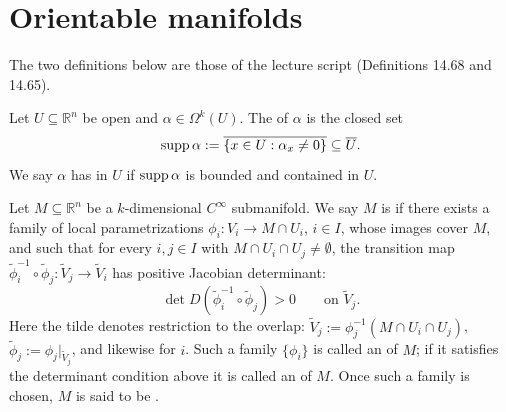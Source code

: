 
\section{Orientable manifolds}
\label{sec:orientable_manifolds}

\begin{ainote}
The two definitions below are those of the lecture script (Definitions 14.68 and 14.65).
\end{ainote}

\begin{definition}
\label{def:support_of_k_form}
Let $U \subseteq \mathbb{R}^n$ be open and $\alpha \in \Omega^k(U)$. The 
of $\alpha$ is the closed set
\[\operatorname{supp}\alpha := \overline{\{x\in U : \alpha_x \neq 0\}} \subseteq \overline{U}.\]
We say $\alpha$ has  in $U$ if $\operatorname{supp}\alpha$ is bounded and contained
in $U$.
\end{definition}

\begin{definition}
\label{def:orientable_manifold}
Let $M \subseteq \mathbb{R}^n$ be a $k$-dimensional $C^\infty$ submanifold. We say $M$ is
  if there exists a family of local
parametrizations $\phi_i : V_i \to M \cap U_i$, $i \in I$, whose images cover $M$, and such
that for every $i,j \in I$ with $M \cap U_i \cap U_j \neq \emptyset$, the transition map
$\widetilde\phi_i^{-1}\circ\widetilde\phi_j : \widetilde V_j \to \widetilde V_i$ has positive
Jacobian determinant:
\[\det D(\widetilde\phi_i^{-1}\circ\widetilde\phi_j) > 0 \qquad \text{on } \widetilde V_j.\]
Here the tilde denotes restriction to the overlap: $\widetilde V_j := \phi_j^{-1}(M\cap U_i\cap
U_j)$, $\widetilde\phi_j := \phi_j|_{\widetilde V_j}$, and likewise for $i$.
Such a family $\{\phi_i\}$ is called an  of $M$; if it satisfies the
determinant condition above it is called an  of $M$. Once such a family
is chosen, $M$ is said to be .
\end{definition}

